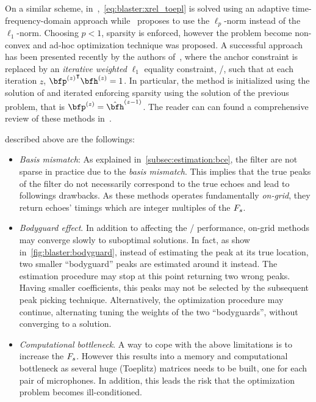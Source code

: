 \mynewline
On a similar scheme, in~,~\cref{eq:blaster:xrel_toepl} is solved using an adaptive time-frequency-domain approach while~ proposes to use the $\ell_p$-norm instead of the $\ell_1$-norm.
Choosing $p < 1$, sparsity is enforced, however the problem become non-convex and ad-hoc optimization technique was proposed.
A successful approach has been presented recently by the authors of~, where the anchor constraint is replaced by an \textit{iterative weighted} $\ell_1$ equality constraint, \ie/, such that at each iteration $z$, $\ktranspose{\bfp^{(z)}}\bfh^{(z)} = 1$.
In particular, the method is initialized using the solution of  and iterated enforcing sparsity using the solution of the previous problem, that is $\bfp^{(z)} = \hat{\bfh}^{(z-1)}$.
The reader can can found a comprehensive review of these methods in~.

 described above are the followings:
\begin{itemize}
    \item \textit{Basis mismatch}:
    As explained in~\cref{subsec:estimation:bce}, the filter are not sparse in practice due to the \textit{basis mismatch}.
    This implies that the true peaks of the filter do not necessarily correspond to the true echoes and lead to followings drawbacks.
    As these methods operates fundamentally \textit{on-grid}, they return echoes' timings which are integer multiples of the $F_s$.
    \item \textit{Bodyguard effect}.
    In addition to affecting the \AER/ performance, on-grid methods may converge slowly to suboptimal solutions.
    In fact, as show in~\cref{fig:blaster:bodyguard}, instead of estimating the peak at its true location, two smaller ``bodyguard'' peaks are estimated around it instead.
    The estimation procedure may stop at this point returning two wrong peaks.
    Having smaller coefficients, this peaks may not be selected by the subsequent peak picking technique.
    Alternatively, the optimization procedure may continue, alternating tuning the weights of the two ``bodyguards'', without converging to a solution.
    \item \textit{Computational bottleneck}.
    A way to cope with the above limitations is to increase the $F_s$.
    However this results into a memory and computational bottleneck as several huge (Toeplitz) matrices needs to be built, one for each pair of microphones.
    In addition, this leads the risk that the optimization problem becomes ill-conditioned.
\end{itemize}

